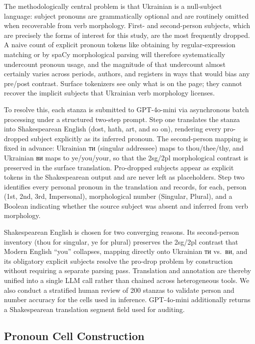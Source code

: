 \documentclass[12pt]{interact}
\theoremstyle{plain}%
\theoremstyle{definition}
\theoremstyle{remark}
\begin{document}
The methodologically central problem is that Ukrainian is a null-subject language: subject pronouns are grammatically optional and are routinely omitted when recoverable from verb morphology. First- and second-person subjects, which are precisely the forms of interest for this study, are the most frequently dropped. A naive count of explicit pronoun tokens like obtaining by regular-expression matching or by spaCy morphological parsing will therefore systematically undercount pronoun usage, and the magnitude of that undercount almost certainly varies across periods, authors, and registers in ways that would bias any pre/post contrast. Surface tokenizers see only what is on the page; they cannot recover the implicit subjects that Ukrainian verb morphology licenses.

To resolve this, each stanza is submitted to GPT-4o-mini via asynchronous batch processing under a structured two-step prompt. Step one translates the stanza into Shakespearean English (dost, hath, art, and so on), rendering every pro-dropped subject explicitly as its inferred pronoun. The second-person mapping is fixed in advance: Ukrainian {\ukrainianfont ти} (singular addressee) maps to thou/thee/thy, and Ukrainian {\ukrainianfont ви} maps to ye/you/your, so that the 2sg/2pl morphological contrast is preserved in the surface translation. Pro-dropped subjects appear as explicit tokens in the Shakespearean output and are never left as placeholders. Step two identifies every personal pronoun in the translation and records, for each, person (1st, 2nd, 3rd, Impersonal), morphological number (Singular, Plural), and a Boolean indicating whether the source subject was absent and inferred from verb morphology.

Shakespearean English is chosen for two converging reasons. Its second-person inventory (thou for singular, ye for plural) preserves the 2sg/2pl contrast that Modern English ``you'' collapses, mapping directly onto Ukrainian {\ukrainianfont ти} vs.\ {\ukrainianfont ви}, and its obligatory explicit subjects resolve the pro-drop problem by construction without requiring a separate parsing pass. Translation and annotation are thereby unified into a single LLM call rather than chained across heterogeneous tools. We also conduct a stratified human review of 200 stanzas to validate person and number accuracy for the cells used in inference. GPT-4o-mini additionally returns a Shakespearean translation segment field used for auditing.

\subsection{Pronoun Cell Construction}
\end{document}
